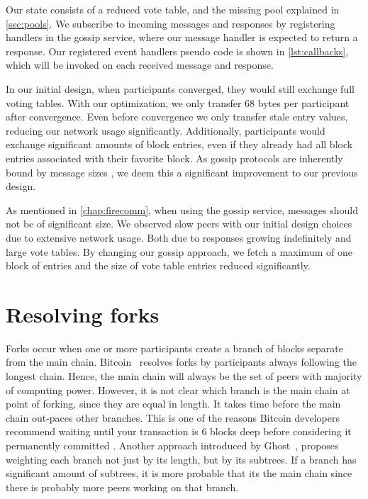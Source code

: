 \documentclass[USenglish]{uit-thesis}
\begin{document}
Our state consists of a reduced vote table, and the missing pool explained in \autoref{sec:pools}.
We subscribe to incoming messages and responses by registering handlers in the gossip service, where our message handler is expected to return a response. 
Our registered event handlers pseudo code is shown in \autoref{lst:callbacks}, which will be invoked on each received message and response.

\begin{code}
\end{code}


In our initial design, when participants converged, they would still exchange full voting tables.
With our optimization, we only transfer 68 bytes per participant after convergence.
Even before convergence we only transfer stale entry values, reducing our network usage significantly.     
Additionally, participants would exchange significant amounts of block entries, even if they already had all block entries associated with their favorite block. 
As gossip protocols are inherently bound by message sizes \cite{gossip_promise}, we deem this a significant improvement to our previous design. 

As mentioned in \autoref{chap:firecomm}, when using the gossip service, messages should not be of significant size.
We observed slow peers with our initial design choices due to extensive network usage.
Both due to responses growing indefinitely and large vote tables.
By changing our gossip approach, we fetch a maximum of one block of entries and the size of vote table entries reduced significantly.





\section{Resolving forks}
Forks occur when one or more participants create a branch of blocks separate from the main chain.
Bitcoin~\cite{bitcoin} resolves forks by participants always following the longest chain.
Hence, the main chain will always be the set of peers with majority of computing power.
However, it is not clear which branch is the main chain at point of forking, since they are equal in length.
It takes time before the main chain out-paces other branches.
This is one of the reasons Bitcoin developers recommend waiting until your transaction is 6 blocks deep before considering it permanently committed \cite{propa}.
Another approach introduced by Ghost~\cite{ghost}, proposes weighting each branch not just by its length, but by its subtrees.
If a branch has significant amount of subtrees, it is more probable that its the main chain since there is probably more peers working on that branch.
\end{document}
